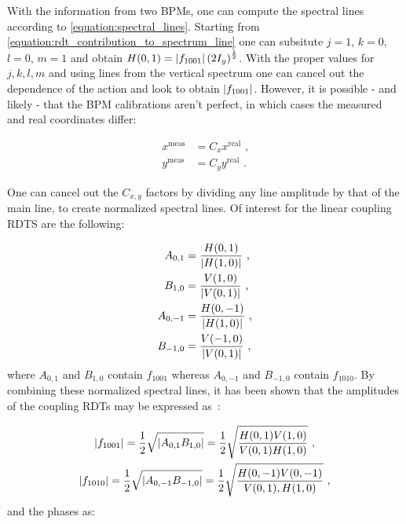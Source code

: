 With the information from two BPMs, one can compute the spectral lines according to \cref{equation:spectral_lines}.
Starting from \cref{equation:rdt_contribution_to_spectrum_line} one can subsitute \(j = 1\), \(k = 0\), \(l = 0\), \(m = 1\) and obtain \(H(0, 1) = \left\lvert f_{1001} \right\rvert \left(2 I_y \right)^{\frac{1}{2}}\).
With the proper values for \(j,k,l,m\) and using lines from the vertical spectrum one can cancel out the dependence of the action and look to obtain \(\left\lvert f_{1001} \right\rvert\).
However, it is possible - and likely - that the BPM calibrations aren't perfect, in which cases the measured and real coordinates differ:

\begin{equation}
  \begin{aligned}
    x^{\mathrm{meas}} &= C_x x^{\mathrm{real}}  \text{ ,}  \\
    y^{\mathrm{meas}} &= C_y y^{\mathrm{real}}  \text{ .}
  \end{aligned}
\end{equation}

One can cancel out the \(C_{x,y}\) factors by dividing any line amplitude by that of the main line, to create normalized spectral lines.
Of interest for the linear coupling RDTS are the following:

\begin{equation}
  \begin{aligned}
    A_{0,1} &= \frac{H(0,1)}{\left\lvert H(1,0) \right\rvert}    \text{ ,}  \\
    B_{1,0} &= \frac{V(1,0)}{\left\lvert V(0,1) \right\rvert}    \text{ ,}  \\
    A_{0,-1} &= \frac{H(0,-1)}{\left\lvert H(1,0) \right\rvert}  \text{ ,}  \\
    B_{-1,0} &= \frac{V(-1,0)}{\left\lvert V(0,1) \right\rvert}  \text{ ,}
  \end{aligned}
  \label{equation:normalized_spectral_lines}
\end{equation}
where \(A_{0,1}\) and \(B_{1,0}\) contain \(f_{1001}\) whereas \(A_{0,-1}\) and \(B_{-1,0}\) contain \(f_{1010}\).
By combining these normalized spectral lines, it has been shown that the amplitudes of the coupling RDTs may be expressed as~\cite{CERN:Franchi:Computation_Coupling_Resonance_Driving_Term_Single_BPM,PRAB:Tomas:CERN_LHC_OMC}:

\begin{equation}
  \begin{gathered}
    \left\lvert f_{1001} \right\rvert = \frac{1}{2} \sqrt{\left\lvert A_{0,1} B_{1,0} \right\rvert}   = \frac{1}{2} \sqrt{\frac{H(0,1) V(1,0)}{V(0,1) H(1,0)}}       \text{ ,}  \\
    \left\lvert f_{1010} \right\rvert = \frac{1}{2} \sqrt{\left\lvert A_{0,-1} B_{-1,0} \right\rvert} = \frac{1}{2} \sqrt{\frac{H(0,-1) V(0,-1)}{V(0,1), H(1,0)}}  \text{ ,}
  \end{gathered}
  \label{equation:coupling_rdts_amplitude_from_spectral_lines}
\end{equation}
and the phases as:


